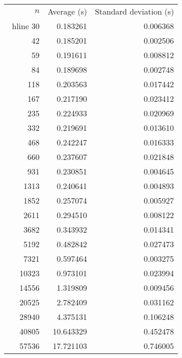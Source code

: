 \begin{tabular}{rrr}
$n$& Average (s) & Standard deviation (s)\\\ hline
30& 0.183261& 0.006368\\
42& 0.185201& 0.002506\\
59& 0.191611& 0.008812\\
84& 0.189698& 0.002748\\
118& 0.203563& 0.017442\\
167& 0.217190& 0.023412\\
235& 0.224933& 0.020969\\
332& 0.219691& 0.013610\\
468& 0.242247& 0.016333\\
660& 0.237607& 0.021848\\
931& 0.230851& 0.004645\\
1313& 0.240641& 0.004893\\
1852& 0.257074& 0.005927\\
2611& 0.294510& 0.008122\\
3682& 0.343932& 0.014341\\
5192& 0.482842& 0.027473\\
7321& 0.597464& 0.003275\\
10323& 0.973101& 0.023994\\
14556& 1.319809& 0.009456\\
20525& 2.782409& 0.031162\\
28940& 4.375131& 0.106248\\
40805& 10.643329& 0.452478\\
57536& 17.721103& 0.746005\\
\end{tabular}
